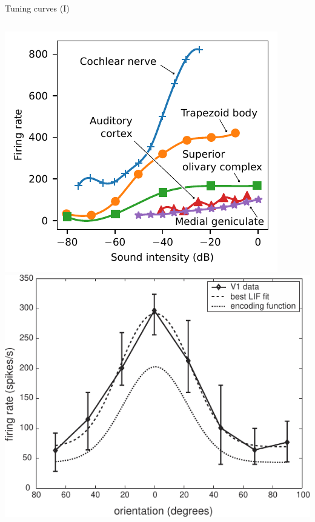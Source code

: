 \documentclass[handout,aspectratio=169]{beamer}
\begin{document}
\begin{frame}{Tuning curves (I)}
	\begin{columns}
		\includegraphics[width=\textwidth]{media/audition_tuning_curves_annotated.pdf}%
		\includegraphics[width=\textwidth]{media/eliasmith_et_al_2003_orientation_tuning.pdf}%
	\end{columns}
\end{frame}
\end{document}
